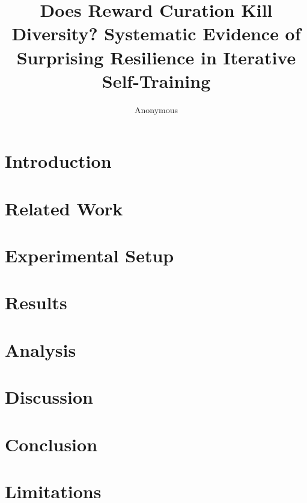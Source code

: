 \documentclass[11pt]{article}
\title{Does Reward Curation Kill Diversity? Systematic Evidence of\\Surprising Resilience in Iterative Self-Training}
\author{Anonymous}
\begin{document}
\maketitle

\begin{abstract}

\end{abstract}

\section{Introduction}
\label{sec:introduction}


\section{Related Work}
\label{sec:related_work}


\section{Experimental Setup}
\label{sec:experimental_setup}


\section{Results}
\label{sec:results}


\section{Analysis}
\label{sec:analysis}


\section{Discussion}
\label{sec:discussion}


\section{Conclusion}
\label{sec:conclusion}


\section*{Limitations}




\appendix

\end{document}
